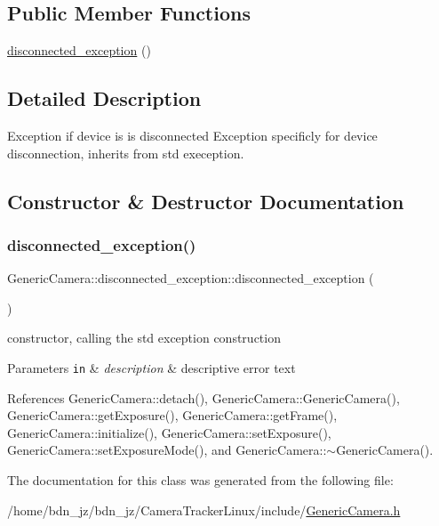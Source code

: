 \subsection*{Public Member Functions}
\begin{DoxyCompactItemize}
\item 
\hyperlink{classGenericCamera_1_1disconnected__exception_ac3e9d17d6848faa8bf458c19ebe21812}{disconnected\+\_\+exception} ()
\end{DoxyCompactItemize}


\subsection{Detailed Description}
Exception if device is is disconnected Exception specificly for device disconnection, inherits from std exeception. 

\subsection{Constructor \& Destructor Documentation}
\mbox{\label{classGenericCamera_1_1disconnected__exception_ac3e9d17d6848faa8bf458c19ebe21812}} 
\subsubsection{\texorpdfstring{disconnected\+\_\+exception()}{disconnected\_exception()}}
{\footnotesize\ttfamily Generic\+Camera\+::disconnected\+\_\+exception\+::disconnected\+\_\+exception (\begin{DoxyParamCaption}{ }\end{DoxyParamCaption})\hspace{0.3cm}{\ttfamily [inline]}}

constructor, calling the std exception construction 
\begin{DoxyParams}[1]{Parameters}
\mbox{\tt in}  & {\em description} & descriptive error text \\
\hline
\end{DoxyParams}


References Generic\+Camera\+::detach(), Generic\+Camera\+::\+Generic\+Camera(), Generic\+Camera\+::get\+Exposure(), Generic\+Camera\+::get\+Frame(), Generic\+Camera\+::initialize(), Generic\+Camera\+::set\+Exposure(), Generic\+Camera\+::set\+Exposure\+Mode(), and Generic\+Camera\+::$\sim$\+Generic\+Camera().



The documentation for this class was generated from the following file\+:\begin{DoxyCompactItemize}
\item 
/home/bdn\+\_\+jz/bdn\+\_\+jz/\+Camera\+Tracker\+Linux/include/\hyperlink{GenericCamera_8h}{Generic\+Camera.\+h}\end{DoxyCompactItemize}
